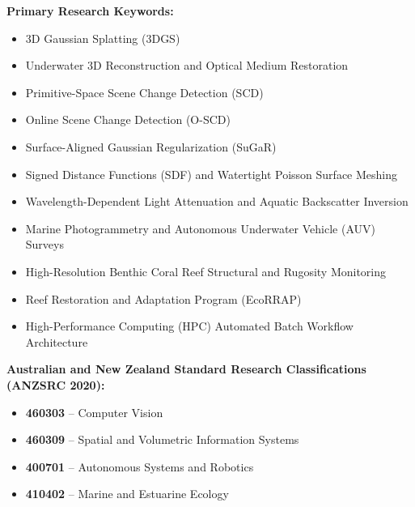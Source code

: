 
\noindent
\textbf{Primary Research Keywords:}
\begin{itemize}
    \item 3D Gaussian Splatting (3DGS)
    \item Underwater 3D Reconstruction and Optical Medium Restoration
    \item Primitive-Space Scene Change Detection (SCD)
    \item Online Scene Change Detection (O-SCD)
    \item Surface-Aligned Gaussian Regularization (SuGaR)
    \item Signed Distance Functions (SDF) and Watertight Poisson Surface Meshing
    \item Wavelength-Dependent Light Attenuation and Aquatic Backscatter Inversion
    \item Marine Photogrammetry and Autonomous Underwater Vehicle (AUV) Surveys
    \item High-Resolution Benthic Coral Reef Structural and Rugosity Monitoring
    \item Reef Restoration and Adaptation Program (EcoRRAP)
    \item High-Performance Computing (HPC) Automated Batch Workflow Architecture
\end{itemize}

\vspace{1.5em}
\noindent
\textbf{Australian and New Zealand Standard Research Classifications (ANZSRC 2020):}
\begin{itemize}
    \item \textbf{460303} -- Computer Vision
    \item \textbf{460309} -- Spatial and Volumetric Information Systems
    \item \textbf{400701} -- Autonomous Systems and Robotics
    \item \textbf{410402} -- Marine and Estuarine Ecology
\end{itemize}
